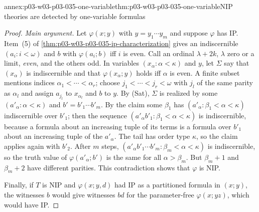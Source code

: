 \begin{annexitem}{annex:p03-w03-p03-035-one-variable}{thm:p03-w03-p03-035-one-variable}{NIP theories are detected by one-variable formulas}
\begin{proof}
\emph{Main argument.}  Let \(\varphi(x;y)\) with \(y=y_1\cdots y_m\) and
suppose \(\varphi\) has IP.  Item~(5) of
\cref{thm:p03-w03-p03-035-ip-characterization} gives an indiscernible
\((a_i:i<\omega)\) and \(b\) with \(\varphi(a_i;b)\) iff \(i\) is even.  Call
an ordinal \(\lambda+2k\), \(\lambda\) zero or a limit, \emph{even}, and the
others odd.  In variables \((x_\alpha:\alpha<\kappa)\) and \(y\), let
\(\Sigma\) say that \((x_\alpha)\) is indiscernible and that
\(\varphi(x_\alpha;y)\) holds iff \(\alpha\) is even.  A finite subset
mentions indices \(\alpha_1<\cdots<\alpha_r\); choose
\(j_1<\cdots<j_r<\omega\) with \(j_l\) of the same parity as \(\alpha_l\) and
assign \(a_{j_l}\) to \(x_{\alpha_l}\) and \(b\) to \(y\).  By (Sat),
\(\Sigma\) is realized by some \((a'_\alpha:\alpha<\kappa)\) and
\(b'=b'_1\cdots b'_m\).  By the claim some \(\beta_1\) has
\((a'_\alpha:\beta_1<\alpha<\kappa)\) indiscernible over \(b'_1\); then the
sequence \((a'_\alpha b'_1:\beta_1<\alpha<\kappa)\) is indiscernible, because a
formula about an increasing tuple of its terms is a formula over \(b'_1\) about
an increasing tuple of the \(a'_\alpha\).  The tail has order type \(\kappa\),
so the claim applies again with \(b'_2\).  After \(m\) steps,
\((a'_\alpha b'_1\cdots b'_m:\beta_m<\alpha<\kappa)\) is indiscernible, so the
truth value of \(\varphi(a'_\alpha;b')\) is the same for all
\(\alpha>\beta_m\).  But \(\beta_m+1\) and \(\beta_m+2\) have different
parities.  This contradiction shows that \(\varphi\) is NIP.

Finally, if \(T\) is NIP and \(\varphi(x;y,d)\) had IP as a partitioned formula
in \((x;y)\), the witnesses \(b\) would give witnesses \(bd\) for the
parameter-free \(\varphi(x;yz)\), which would have IP.
\end{proof}
\end{annexitem}

